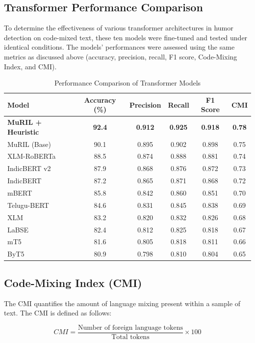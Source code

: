 \documentclass[conference]{IEEEtran}
\begin{document}
\subsection{Transformer Performance Comparison}

To determine the effectiveness of various transformer architectures in humor detection on code-mixed text, these ten models were fine-tuned and tested under identical conditions. The models' performances were assessed using the same metrics as discussed above (accuracy, precision, recall, F1 score, Code-Mixing Index, and CMI).

\begin{table}[h]
\centering
\caption{Performance Comparison of Transformer Models}
\label{tab:transformers}
\begin{tabular}{lccccc}
\hline
Model & Accuracy (\%) & Precision & Recall & F1 Score & CMI \\
\hline
\textbf{MuRIL + Heuristic} & \textbf{92.4} & \textbf{0.912} & \textbf{0.925} & \textbf{0.918} & \textbf{0.78} \\
MuRIL (Base) & 90.1 & 0.895 & 0.902 & 0.898 & 0.75 \\
XLM-RoBERTa & 88.5 & 0.874 & 0.888 & 0.881 & 0.74 \\
IndicBERT v2 & 87.9 & 0.868 & 0.876 & 0.872 & 0.73 \\
IndicBERT & 87.2 & 0.865 & 0.871 & 0.868 & 0.72 \\
mBERT & 85.8 & 0.842 & 0.860 & 0.851 & 0.70 \\
Telugu-BERT & 84.6 & 0.831 & 0.845 & 0.838 & 0.69 \\
XLM & 83.2 & 0.820 & 0.832 & 0.826 & 0.68 \\
LaBSE & 82.4 & 0.812 & 0.825 & 0.818 & 0.67 \\
mT5 & 81.6 & 0.805 & 0.818 & 0.811 & 0.66 \\
ByT5 & 80.9 & 0.798 & 0.810 & 0.804 & 0.65 \\
\hline
\end{tabular}
\end{table}

\subsection{Code-Mixing Index (CMI)}

The CMI quantifies the amount of language mixing present within a sample of text. The CMI is defined as follows:

\begin{equation}
CMI = \frac{\text{Number of foreign language tokens}}{\text{Total tokens}} \times 100
\end{equation}
\end{document}
